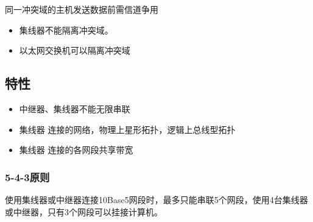 同一冲突域的主机发送数据前需信道争用

\begin{itemize}
    \item 集线器不能隔离冲突域。
    \item 以太网交换机可以隔离冲突域
\end{itemize}


\subsection{特性}
\begin{itemize}
    \item 中继器、集线器不能无限串联
    \item 集线器 连接的网络，物理上星形拓扑，逻辑上总线型拓扑
    \item 集线器 连接的各网段共享带宽
\end{itemize}

\subsubsection{5-4-3原则}
使用集线器或中继器连接10Base5网段时，最多只能串联5个网段，使用4台集线器或中继器，只有3个网段可以挂接计算机。



